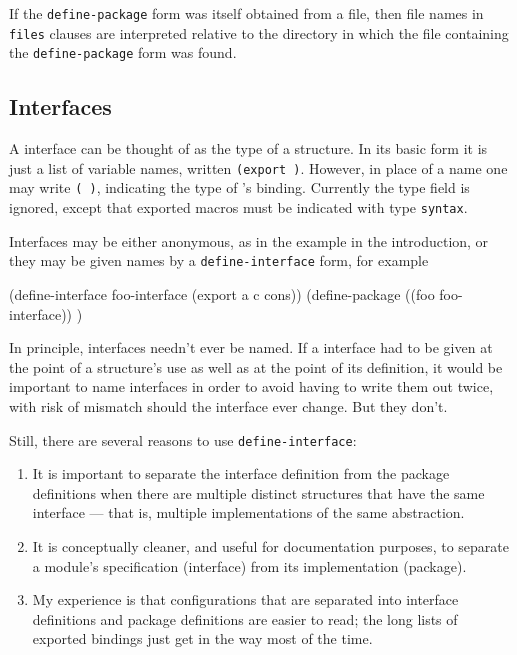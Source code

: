 If the {\tt define-package} form was itself obtained from a file, then
file names in {\tt files} clauses are interpreted relative to the
directory in which the file containing the {\tt define-package} form
was found.


\subsection*{Interfaces}

A interface can be thought of as the type of a structure.  In its
basic form it is just a list of variable names, written {\tt(export
 \etc)}.  However, in place of
a name one may write {\tt( )}, indicating the type
of 's binding.  Currently the type field is ignored, except
that exported macros must be indicated with type {\tt syntax}.

Interfaces may be either anonymous, as in the example in the
introduction, or they may be given names by a {\tt define-interface}
form, for example
\begin{code}
    (define-interface foo-interface (export a c cons))
    (define-package ((foo foo-interface)) \etc)
\end{code}
In principle, interfaces needn't ever be named.  If a interface
had to be given at the point of a structure's use as well as at the
point of its definition, it would be important to name interfaces in
order to avoid having to write them out twice, with risk of mismatch
should the interface ever change.  But they don't.

Still, there are several reasons to use {\tt define-interface}:
\begin{enumerate}
\item It is important to separate the interface definition from the
package definitions when there are multiple distinct structures that
have the same interface --- that is, multiple implementations of the
same abstraction.

\item It is conceptually cleaner, and useful for documentation
purposes, to separate a module's specification (interface) from its
implementation (package).

\item My experience is that configurations that are separated into
interface definitions and package definitions are easier to read; the
long lists of exported bindings just get in the way most of the time.
\end{enumerate}

